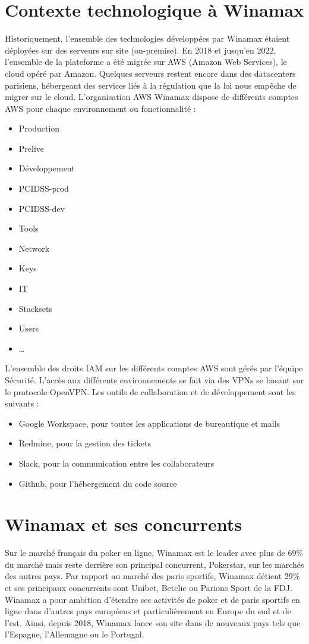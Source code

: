 \section{Contexte technologique à Winamax}

Historiquement, l’ensemble des technologies développées par Winamax étaient
déployées sur des serveurs sur site (on-premise). En 2018 et jusqu’en 2022, l’ensemble
de la plateforme a été migrée sur AWS (Amazon Web Services), le cloud opéré par
Amazon. Quelques serveurs restent encore dans des datacenters parisiens, hébergeant des services liés à la régulation que la loi nous empêche de migrer sur le cloud.
L’organisation AWS Winamax dispose de différents comptes AWS pour
chaque environnement ou fonctionnalité :
\begin{itemize}
	\item Production
	\item Prelive
	\item Développement
	\item PCIDSS-prod
	\item PCIDSS-dev
	\item Tools
	\item Network
	\item Keys
	\item IT
	\item Stacksets
	\item Users
	\item \ldots
\end{itemize}

L’ensemble des droits IAM sur les différents comptes AWS sont gérés par
l’équipe Sécurité.
L’accès aux différents environnements se fait via des VPNs se basant sur
le protocole OpenVPN. Les outils de collaboration et de développement sont les
suivants :

\begin{itemize}
	\item Google Workspace, pour toutes les applications de bureautique et mails
	\item Redmine, pour la gestion des tickets
	\item Slack, pour la communication entre les collaborateurs
	\item Github, pour l’hébergement du code source
\end{itemize}

\section{Winamax et ses concurrents}

Sur le marché français du poker en ligne, Winamax est le leader avec plus
de 69\% du marché mais reste derrière son principal concurrent, Pokerstar, sur les
marchés des autres pays. Par rapport au marché des paris sportifs, Winamax détient
29\% et ses principaux concurrents sont Unibet, Betclic ou Parions Sport de la FDJ.
Winamax a pour ambition d’étendre ses activités de poker et de paris sportifs en
ligne dans d’autres pays européens et particulièrement en Europe du sud et de
l’est. Ainsi, depuis 2018, Winamax lance son site dans de nouveaux pays tels que
l’Espagne, l’Allemagne ou le Portugal.


